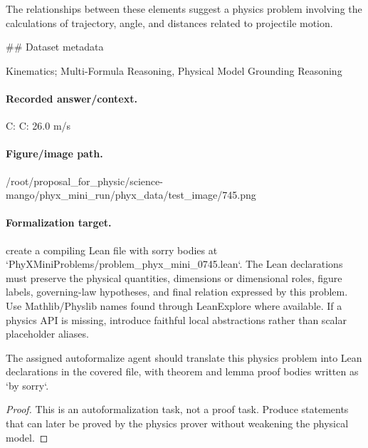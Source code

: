 The relationships between these elements suggest a physics problem involving the calculations of trajectory, angle, and distances related to projectile motion.

\#\# Dataset metadata

Kinematics; Multi-Formula Reasoning, Physical Model Grounding Reasoning

\paragraph{Recorded answer/context.}
C: C: 26.0 m/s

\paragraph{Figure/image path.}
/root/proposal\_for\_physic/science-mango/phyx\_mini\_run/phyx\_data/test\_image/745.png

\paragraph{Formalization target.}
create a compiling Lean file with sorry bodies at `PhyXMiniProblems/problem\_phyx\_mini\_0745.lean`. The Lean declarations must preserve the physical quantities, dimensions or dimensional roles, figure labels, governing-law hypotheses, and final relation expressed by this problem.
Use Mathlib/Physlib names found through LeanExplore where available. If a physics API is missing, introduce faithful local abstractions rather than scalar placeholder aliases.

\begin{theorem}
\label{thm:physics:phyx_mini_0745:target}
The assigned autoformalize agent should translate this physics problem into Lean declarations in the covered file, with theorem and lemma proof bodies written as `by sorry`.
\end{theorem}
\begin{proof}
This is an autoformalization task, not a proof task. Produce statements that can later be proved by the physics prover without weakening the physical model.
\end{proof}

